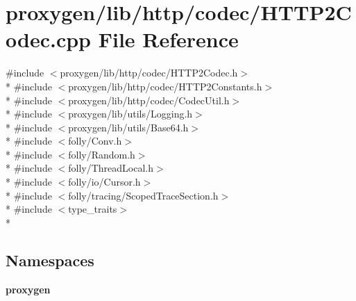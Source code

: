 \section{proxygen/lib/http/codec/\+H\+T\+T\+P2\+Codec.cpp File Reference}
\label{HTTP2Codec_8cpp}
{\ttfamily \#include $<$proxygen/lib/http/codec/\+H\+T\+T\+P2\+Codec.\+h$>$}\\*
{\ttfamily \#include $<$proxygen/lib/http/codec/\+H\+T\+T\+P2\+Constants.\+h$>$}\\*
{\ttfamily \#include $<$proxygen/lib/http/codec/\+Codec\+Util.\+h$>$}\\*
{\ttfamily \#include $<$proxygen/lib/utils/\+Logging.\+h$>$}\\*
{\ttfamily \#include $<$proxygen/lib/utils/\+Base64.\+h$>$}\\*
{\ttfamily \#include $<$folly/\+Conv.\+h$>$}\\*
{\ttfamily \#include $<$folly/\+Random.\+h$>$}\\*
{\ttfamily \#include $<$folly/\+Thread\+Local.\+h$>$}\\*
{\ttfamily \#include $<$folly/io/\+Cursor.\+h$>$}\\*
{\ttfamily \#include $<$folly/tracing/\+Scoped\+Trace\+Section.\+h$>$}\\*
{\ttfamily \#include $<$type\+\_\+traits$>$}\\*
\subsection*{Namespaces}
\begin{DoxyCompactItemize}
\item 
 {\bf proxygen}
\end{DoxyCompactItemize}
